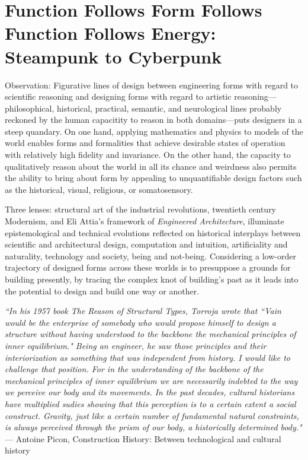 \section{Function Follows Form Follows Function Follows Energy: Steampunk to Cyberpunk}

Observation: Figurative lines of design between engineering forms with regard to scientific reasoning and designing forms with regard to artistic reasoning---philosophical, historical, practical, semantic, and neurological lines probably reckoned by the human capacitity to reason in both domains---puts designers in a steep quandary. On one hand, applying mathematics and physics to models of the world enables forms and formalities that achieve desirable states of operation with relatively high fidelity and invariance. On the other hand, the capacity to qualitatively reason about the world in all its chance and weirdness also permits the ability to bring about form by appealing to unquantifiable design factors such as the historical, visual, religious, or somatosensory.

Three lenses: structural art of the industrial revolutions, twentieth century Modernism, and Eli Attia's framework of \textit{Engineered Architecture}, illuminate epistemological and technical evolutions reflected on historical
interplays between scientific and architectural design, computation and intuition, artificiality and naturality, technology and society, being and not-being. Considering a low-order trajectory of designed forms across these worlds is to presuppose a grounds for building presently, by tracing the complex knot of building's past as it leads into the potential to design and build one way or another.

\begin{flushright}
  \small{
  \textit{``In his 1957 book \textrm{The Reason of Structural Types}, Torroja wrote that ``Vain would be the enterprise of somebody who would propose himself to design a structure without having understood to the backbone the mechanical principles of inner equilibrium." Being an engineer, he saw those principles and their interiorization as something that was independent from history. I would like to challenge that position. For in the understanding of the backbone of the mechanical principles of inner equilibrium we are necessarily indebted to the way we perceive our body and its movements. In the past decades, cultural historians have multiplied sudies showing that this perception is to a certain extent a social construct. Gravity, just like a certain number of fundamental natural constraints, is always perceived through the prism of our body, a historically determined body."}} \\ --- Antoine Picon, Construction History: Between technological and cultural history
\end{flushright}

